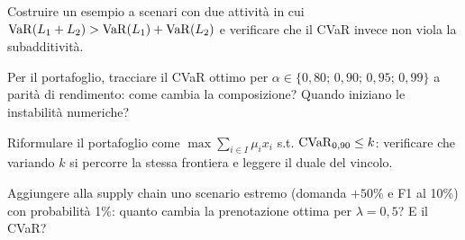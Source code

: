 \begin{esercizio}[subadditività]
Costruire un esempio a scenari con due attività in cui
$\mathrm{VaR}(L_1 + L_2) > \mathrm{VaR}(L_1) + \mathrm{VaR}(L_2)$ e verificare che il CVaR invece non viola
la subadditività.
\end{esercizio}

\begin{esercizio}
Per il portafoglio, tracciare il CVaR ottimo per
$\alpha \in \{0{,}80;\, 0{,}90;\, 0{,}95;\, 0{,}99\}$ a parità di rendimento:
come cambia la composizione? Quando iniziano le instabilità numeriche?
\end{esercizio}

\begin{esercizio}
Riformulare il portafoglio come $\max \sum_{i \in I} \mu_i x_i$ s.t. $\mathrm{CVaR}_{0,90} \le k$: verificare
che variando $k$ si percorre la stessa frontiera e leggere il duale del vincolo.
\end{esercizio}

\begin{esercizio}
Aggiungere alla supply chain uno scenario estremo (domanda $+50\%$ e F1 al 10\%) con
probabilità 1\%: quanto cambia la prenotazione ottima per $\lambda = 0{,}5$?
E il CVaR?
\end{esercizio}

